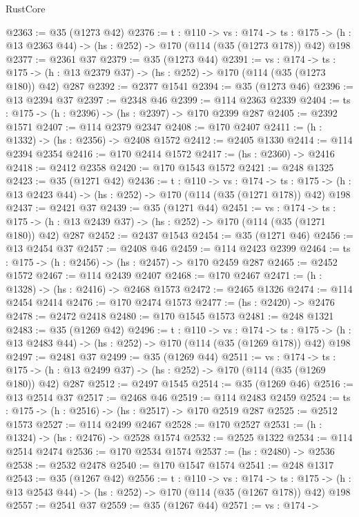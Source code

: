 \begin{lexlean}{RustCore}
\begin{coremodule}
@2363 := @35 (@1273 @42)
@2376 := {t : @110} ->
  {vs : @174} ->
  {ts : @175} -> (h : @13 @2363 @44) -> (hs : @252) -> @170 (@114 (@35 (@1273 @178)) @42) @198
@2377 := @2361 @37
@2379 := @35 (@1273 @44)
@2391 := {vs : @174} ->
  {ts : @175} -> (h : @13 @2379 @37) -> (hs : @252) -> @170 (@114 (@35 (@1273 @180)) @42) @287
@2392 := @2377 @1541
@2394 := @35 (@1273 @46)
@2396 := @13 @2394 @37
@2397 := @2348 @46
@2399 := @114 @2363 @2339
@2404 := {ts : @175} -> (h : @2396) -> (hs : @2397) -> @170 @2399 @287
@2405 := @2392 @1571
@2407 := @114 @2379 @2347
@2408 := @170 @2407
@2411 := (h : @1332) -> (hs : @2356) -> @2408 @1572
@2412 := @2405 @1330
@2414 := @114 @2394 @2354
@2416 := @170 @2414 @1572
@2417 := (hs : @2360) -> @2416
@2418 := @2412 @2358
@2420 := @170 @1543 @1572
@2421 := @248 @1325
@2423 := @35 (@1271 @42)
@2436 := {t : @110} ->
  {vs : @174} ->
  {ts : @175} -> (h : @13 @2423 @44) -> (hs : @252) -> @170 (@114 (@35 (@1271 @178)) @42) @198
@2437 := @2421 @37
@2439 := @35 (@1271 @44)
@2451 := {vs : @174} ->
  {ts : @175} -> (h : @13 @2439 @37) -> (hs : @252) -> @170 (@114 (@35 (@1271 @180)) @42) @287
@2452 := @2437 @1543
@2454 := @35 (@1271 @46)
@2456 := @13 @2454 @37
@2457 := @2408 @46
@2459 := @114 @2423 @2399
@2464 := {ts : @175} -> (h : @2456) -> (hs : @2457) -> @170 @2459 @287
@2465 := @2452 @1572
@2467 := @114 @2439 @2407
@2468 := @170 @2467
@2471 := (h : @1328) -> (hs : @2416) -> @2468 @1573
@2472 := @2465 @1326
@2474 := @114 @2454 @2414
@2476 := @170 @2474 @1573
@2477 := (hs : @2420) -> @2476
@2478 := @2472 @2418
@2480 := @170 @1545 @1573
@2481 := @248 @1321
@2483 := @35 (@1269 @42)
@2496 := {t : @110} ->
  {vs : @174} ->
  {ts : @175} -> (h : @13 @2483 @44) -> (hs : @252) -> @170 (@114 (@35 (@1269 @178)) @42) @198
@2497 := @2481 @37
@2499 := @35 (@1269 @44)
@2511 := {vs : @174} ->
  {ts : @175} -> (h : @13 @2499 @37) -> (hs : @252) -> @170 (@114 (@35 (@1269 @180)) @42) @287
@2512 := @2497 @1545
@2514 := @35 (@1269 @46)
@2516 := @13 @2514 @37
@2517 := @2468 @46
@2519 := @114 @2483 @2459
@2524 := {ts : @175} -> (h : @2516) -> (hs : @2517) -> @170 @2519 @287
@2525 := @2512 @1573
@2527 := @114 @2499 @2467
@2528 := @170 @2527
@2531 := (h : @1324) -> (hs : @2476) -> @2528 @1574
@2532 := @2525 @1322
@2534 := @114 @2514 @2474
@2536 := @170 @2534 @1574
@2537 := (hs : @2480) -> @2536
@2538 := @2532 @2478
@2540 := @170 @1547 @1574
@2541 := @248 @1317
@2543 := @35 (@1267 @42)
@2556 := {t : @110} ->
  {vs : @174} ->
  {ts : @175} -> (h : @13 @2543 @44) -> (hs : @252) -> @170 (@114 (@35 (@1267 @178)) @42) @198
@2557 := @2541 @37
@2559 := @35 (@1267 @44)
@2571 := {vs : @174} ->

\end{coremodule}
\end{lexlean}
